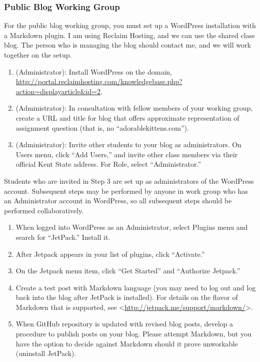 \documentclass[]{article}
\begin{document}
\subsubsection{Public Blog Working
Group}\label{public-blog-working-group}

For the public blog working group, you must set up a WordPress
installation with a Markdown plugin. I am using Reclaim Hosting, and we
can use the shared class blog. The person who is managing the blog
should contact me, and we will work together on the setup.

\begin{enumerate}
\def\labelenumi{\arabic{enumi}.}
\itemsep1pt\parskip0pt
\item
  (Administrator): Install WordPress on the domain,
  \url{http://portal.reclaimhosting.com/knowledgebase.php?action=displayarticle\&id=2}.
\item
  (Administrator): In consultation with fellow members of your working
  group, create a URL and title for blog that offers approximate
  representation of assignment question (that is, no
  ``adorablekittens.com'').
\item
  (Administrator): Invite other students to your blog as administrators.
  On Users menu, click ``Add Users,'' and invite other class members via
  their official Kent State address. For Role, select ``Administrator.''
\end{enumerate}

Students who are invited in Step 3 are set up as administrators of the
WordPress account. Subsequent steps may be performed by anyone in work
group who has an Administrator account in WordPress, so all subsequent
steps should be performed collaboratively.

\begin{enumerate}
\def\labelenumi{\arabic{enumi}.}
\itemsep1pt\parskip0pt
\item
  When logged into WordPress as an Administrator, select Plugins menu
  and search for ``JetPack.'' Install it.\\
\item
  After Jetpack appears in your list of plugins, click ``Activate.''
\item
  On the Jetpack menu item, click ``Get Started'' and ``Authorize
  Jetpack.''
\item
  Create a test post with Markdown language (you may need to log out and
  log back into the blog after JetPack is installed). For details on the
  flavor of Markdown that is supported, see
  \textless{}\url{http://jetpack.me/support/markdown/}\textgreater{}.
\item
  When GitHub repository is updated with revised blog posts, develop a
  procedure to publish posts on your blog. Please attempt Markdown, but
  you have the option to decide against Markdown should it prove
  unworkable (uninstall JetPack).
\end{enumerate}
\end{document}
